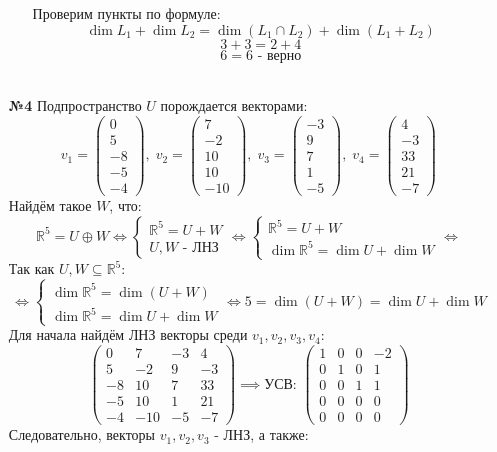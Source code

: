 \documentclass[a4paper]{article}
\newcommand{\mat}[1]{\begin{pmatrix} #1 \end{pmatrix}}
\newcommand{\case}[1]{\begin{cases} #1 \end{cases}}
\newcommand{\lr}{\Leftrightarrow}
\newcommand{\RR}{\mathbb{R}}
\begin{document}
\begin{enumerate}
\begin{enumerate}
    Проверим пункты по формуле:
    $$\dim L_1 + \dim L_2 = \dim(L_1 \cap L_2) + \dim(L_1 + L_2)$$
    $$3 + 3 = 2+ 4$$
    $$6=6 \text{ - верно}$$\\
    \end{enumerate}
        
    \item[\textbf{№4}]Подпространство $U$ порождается векторами:
    $$v_1 = \mat{0 \\5 \\ -8 \\ -5 \\ -4},\; v_2 = \mat{7 \\-2 \\ 10 \\ 10 \\ -10},\; v_3 = \mat{-3\\9\\7\\1\\-5}, \;v_4 = \mat{4\\-3\\33\\21\\-7}$$
    Найдём такое $W$, что:
    $$
    \RR^5= U \oplus W \lr \case{
        \RR^5 = U + W \\
        U, W \text{ - ЛНЗ}
    }\lr \case{
        \RR^5 = U + W \\
        \dim \RR^5 = \dim U + \dim W
    }\lr
    $$
    Так как $U, W \subseteq \RR^5$:
    $$
    \lr \case{
        \dim \RR^5 = \dim(U + W) \\
        \dim \RR^5 = \dim U + \dim W
    }\lr 5 = \dim(U + W) = \dim U + \dim W
    $$
    Для начала найдём ЛНЗ векторы среди $v_1, v_2, v_3, v_4$:
    $$
    \begin{pmatrix}
    0 & 7 & -3 & 4 \\
    5 & -2 & 9 & -3 \\
    -8 & 10 & 7 & 33 \\
    -5 & 10 & 1 & 21 \\
    -4 & -10 & -5 & -7
    \end{pmatrix} \implies \text{УСВ: } \begin{pmatrix}
        1 & 0 & 0 & -2 \\
        0 & 1 & 0 & 1 \\
        0 & 0 & 1 & 1 \\
        0 & 0 & 0 & 0 \\
        0 & 0 & 0 & 0
    \end{pmatrix}
    $$
    Следовательно, векторы $v_1, v_2, v_3$ - ЛНЗ, а также:

\end{enumerate}
\end{document}
